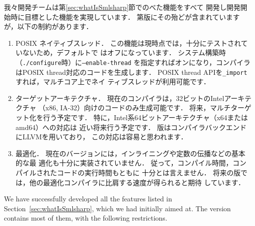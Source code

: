 \ifjp%
	我々開発チームは第\ref{sec:whatIsSmlsharp}節でのべた機能をすべて
開発し\smlsharp{}開発開始時に目標とした機能を実現しています．
	第\version{}版にその殆どが含まれていますが，以下の制約があります．
\begin{enumerate}
\item POSIX ネイティブスレッド．
	この機能は現時点では，十分にテストされていないため，デフォルトで
はオフになっています．
	システム構築時（{\tt ./configure}時）に{\tt --enable-thread}
を指定すればオンになり，コンパイラはPOSIX thread対応のコードを生成します．
	POSIX thread APIを{\tt \_import}すれば，マルチコア上でネイ
ティブスレッドが利用可能です．

\item ターゲットアーキテクチャ．
	現在の\smlsharp{}コンパイラは，32ビットのIntelアーキテクチャ
（x86, IA-32）向けのコードのみ生成可能です．
	将来，マルチターゲット化を行う予定です．
	特に，Intel系64ビットアーキテクチャ（x64またはamd64）への対応は
近い将来行う予定です．
	\smlsharp{}\version{}版はコンパイラバックエンドにLLVMを用いており，
この対応は容易と思われます．


\item 最適化．
	現在のバージョンには，インライニングや定数の伝播などの基本的な最
適化も十分に実装されていません．
	従って，コンパイル時間，コンパイルされたコードの実行時間もともに
十分とは言えません．
	将来の版では，他の最適化コンパイラに比肩する速度が得られると期待
しています．
\end{enumerate}
\else%
	We have successfully developed all the features listed in
Section~\ref{sec:whatIsSmlsharp}, which we had initially aimed at.
	The version \version{} contains most of them, with the following 
restrictions.
